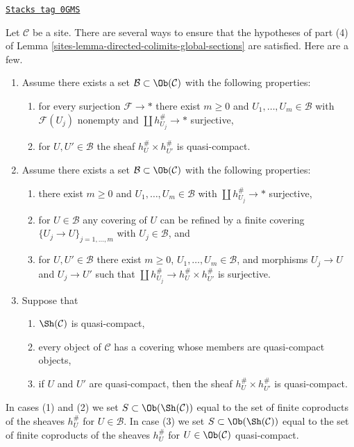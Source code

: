 \begin{remark}
\label{sites-remark-stronger-conditions}
\href{https://stacks.math.columbia.edu/tag/0GMS}{\texttt{Stacks tag 0GMS}}

Let $\mathcal{C}$ be a site. There are several ways to ensure that
the hypotheses of part (4) of
Lemma \ref{sites-lemma-directed-colimits-global-sections}
are satisfied. Here are a few.
\begin{enumerate}
\item Assume there exists a set $\mathcal{B} \subset \Ob(\mathcal{C})$
with the following properties:
\begin{enumerate}
\item for every surjection $\mathcal{F} \to *$ there
exist $m \geq 0$ and $U_1, \ldots, U_m \in \mathcal{B}$
with $\mathcal{F}(U_j)$ nonempty and $\coprod h_{U_j}^\# \to *$ surjective,
\item for $U, U' \in \mathcal{B}$ the sheaf $h_U^\# \times h_{U'}^\#$ is
quasi-compact.
\end{enumerate}
\item Assume there exists a set $\mathcal{B} \subset \Ob(\mathcal{C})$
with the following properties:
\begin{enumerate}
\item there exist $m \geq 0$ and $U_1, \ldots, U_m \in \mathcal{B}$
with $\coprod h_{U_j}^\# \to *$ surjective,
\item for $U \in \mathcal{B}$ any covering of $U$ can be
refined by a finite covering $\{U_j \to U\}_{j = 1, \ldots, m}$ with
$U_j \in \mathcal{B}$, and
\item for $U, U' \in \mathcal{B}$ there exist
$m \geq 0$, $U_1, \ldots, U_m \in \mathcal{B}$, and
morphisms $U_j \to U$ and $U_j \to U'$ such that
$\coprod h_{U_j}^\# \to h_U^\# \times h_{U'}^\#$ is surjective.
\end{enumerate}
\item Suppose that
\begin{enumerate}
\item $\Sh(\mathcal{C})$ is quasi-compact,
\item every object of $\mathcal{C}$ has a covering
whose members are quasi-compact objects,
\item if $U$ and $U'$ are quasi-compact, then the sheaf
$h_U^\# \times h_{U'}^\#$ is quasi-compact.
\end{enumerate}
\end{enumerate}
In cases (1) and (2) we set $S \subset \Ob(\Sh(\mathcal{C}))$ equal to the
set of finite coproducts of the sheaves $h_U^\#$ for $U \in \mathcal{B}$.
In case (3) we set $S \subset \Ob(\Sh(\mathcal{C}))$ equal to the
set of finite coproducts of the sheaves $h_U^\#$ for $U \in \Ob(\mathcal{C})$
quasi-compact.
\end{remark}

